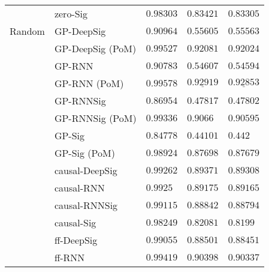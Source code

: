 \begin{tabular}{lllll}
       & zero-Sig &                           $ 0.98303 $ &                           $ 0.83421 $ &                           $ 0.83305 $ \\
Random & GP-DeepSig &                           $ 0.90964 $ &                           $ 0.55605 $ &                           $ 0.55563 $ \\
       & GP-DeepSig (PoM) &                           $ 0.99527 $ &                           $ 0.92081 $ &                           $ 0.92024 $ \\
       & GP-RNN &                           $ 0.90783 $ &                           $ 0.54607 $ &                           $ 0.54594 $ \\
       & GP-RNN (PoM) &                           $ 0.99578 $ &            $  \underline{ 0.92919 } $ &            $  \underline{ 0.92853 } $ \\
       & GP-RNNSig &                           $ 0.86954 $ &                           $ 0.47817 $ &                           $ 0.47802 $ \\
       & GP-RNNSig (PoM) &                           $ 0.99336 $ &                            $ 0.9066 $ &                           $ 0.90595 $ \\
       & GP-Sig &                           $ 0.84778 $ &                           $ 0.44101 $ &                             $ 0.442 $ \\
       & GP-Sig (PoM) &                           $ 0.98924 $ &                           $ 0.87698 $ &                           $ 0.87679 $ \\
       & causal-DeepSig &                           $ 0.99262 $ &                           $ 0.89371 $ &                           $ 0.89308 $ \\
       & causal-RNN &                            $ 0.9925 $ &                           $ 0.89175 $ &                           $ 0.89165 $ \\
       & causal-RNNSig &                           $ 0.99115 $ &                           $ 0.88842 $ &                           $ 0.88794 $ \\
       & causal-Sig &                           $ 0.98249 $ &                           $ 0.82081 $ &                            $ 0.8199 $ \\
       & ff-DeepSig &                           $ 0.99055 $ &                           $ 0.88501 $ &                           $ 0.88451 $ \\
       & ff-RNN &                           $ 0.99419 $ &                           $ 0.90398 $ &                           $ 0.90337 $ \\

\end{tabular}
